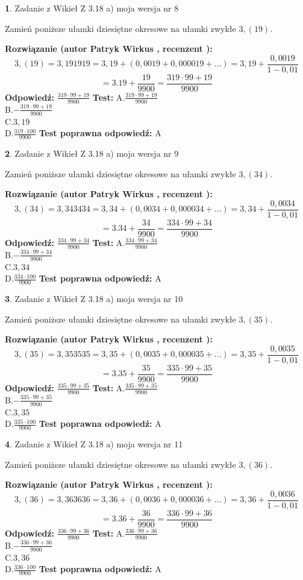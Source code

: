 \documentclass[12pt, a4paper]{article}
\theoremstyle{definition} %
\newtheorem{zad}{}
\newcommand{\zadStart}[1]{\begin{zad}#1\newline}
\newcommand{\zadStop}{\end{zad}}
\newcommand{\rozwStart}[2]{\noindent \textbf{Rozwiązanie (autor #1 , recenzent #2): }\newline}
\newcommand{\rozwStop}{\newline}
\newcommand{\odpStart}{\noindent \textbf{Odpowiedź:}\newline}
\newcommand{\odpStop}{\newline}
\newcommand{\testStart}{\noindent \textbf{Test:}\newline}
\newcommand{\testStop}{\newline}
\newcommand{\kluczStart}{\noindent \textbf{Test poprawna odpowiedź:}\newline}
\newcommand{\kluczStop}{\newline}
\begin{document}
\zadStart{Zadanie z Wikieł Z 3.18 a) moja wersja nr 8}

Zamień poniższe ułamki dziesiętne okresowe na ułamki zwykłe $3,(19)$.
\zadStop
\rozwStart{Patryk Wirkus}{}
$$3,(19)=3,191919=3,19+(0,0019+0,000019+...)=3,19+\frac{0,0019}{1-0,01}$$
$$=3.19+\frac{19}{9900}=\frac{319\cdot99+19}{9900}$$
\rozwStop
\odpStart
$\frac{319\cdot99+19}{9900}$
\odpStop
\testStart
A.$\frac{319\cdot99+19}{9900}$\\ B.$-\frac{319\cdot99+19}{9900}$\\ C.$3,19$\\ D.$\frac{319\cdot100}{9900}$
\testStop
\kluczStart
A
\kluczStop



\zadStart{Zadanie z Wikieł Z 3.18 a) moja wersja nr 9}

Zamień poniższe ułamki dziesiętne okresowe na ułamki zwykłe $3,(34)$.
\zadStop
\rozwStart{Patryk Wirkus}{}
$$3,(34)=3,343434=3,34+(0,0034+0,000034+...)=3,34+\frac{0,0034}{1-0,01}$$
$$=3.34+\frac{34}{9900}=\frac{334\cdot99+34}{9900}$$
\rozwStop
\odpStart
$\frac{334\cdot99+34}{9900}$
\odpStop
\testStart
A.$\frac{334\cdot99+34}{9900}$\\ B.$-\frac{334\cdot99+34}{9900}$\\ C.$3,34$\\ D.$\frac{334\cdot100}{9900}$
\testStop
\kluczStart
A
\kluczStop



\zadStart{Zadanie z Wikieł Z 3.18 a) moja wersja nr 10}

Zamień poniższe ułamki dziesiętne okresowe na ułamki zwykłe $3,(35)$.
\zadStop
\rozwStart{Patryk Wirkus}{}
$$3,(35)=3,353535=3,35+(0,0035+0,000035+...)=3,35+\frac{0,0035}{1-0,01}$$
$$=3.35+\frac{35}{9900}=\frac{335\cdot99+35}{9900}$$
\rozwStop
\odpStart
$\frac{335\cdot99+35}{9900}$
\odpStop
\testStart
A.$\frac{335\cdot99+35}{9900}$\\ B.$-\frac{335\cdot99+35}{9900}$\\ C.$3,35$\\ D.$\frac{335\cdot100}{9900}$
\testStop
\kluczStart
A
\kluczStop



\zadStart{Zadanie z Wikieł Z 3.18 a) moja wersja nr 11}

Zamień poniższe ułamki dziesiętne okresowe na ułamki zwykłe $3,(36)$.
\zadStop
\rozwStart{Patryk Wirkus}{}
$$3,(36)=3,363636=3,36+(0,0036+0,000036+...)=3,36+\frac{0,0036}{1-0,01}$$
$$=3.36+\frac{36}{9900}=\frac{336\cdot99+36}{9900}$$
\rozwStop
\odpStart
$\frac{336\cdot99+36}{9900}$
\odpStop
\testStart
A.$\frac{336\cdot99+36}{9900}$\\ B.$-\frac{336\cdot99+36}{9900}$\\ C.$3,36$\\ D.$\frac{336\cdot100}{9900}$
\testStop
\kluczStart
A
\kluczStop
\end{document}
